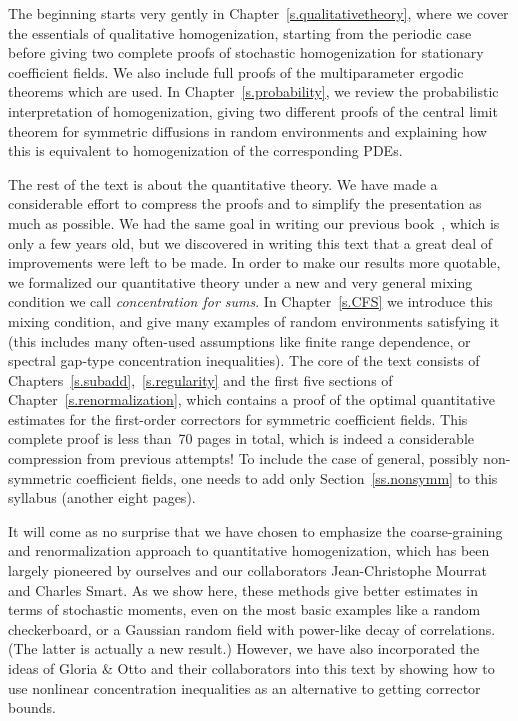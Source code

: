 \documentclass[11pt]{article} %
\numberwithin{equation}{section}
\theoremstyle{definition}
\begin{document}
 \smallskip
 
The beginning starts very gently in Chapter~\ref{s.qualitativetheory}, where we cover the essentials of qualitative homogenization, starting from the periodic case before giving two complete proofs of stochastic homogenization for stationary coefficient fields. We also include full proofs of the multiparameter ergodic theorems which are used. 
In Chapter~\ref{s.probability}, we review the probabilistic interpretation of homogenization, giving two different proofs of the central limit theorem for symmetric diffusions in random environments and explaining how this is equivalent to homogenization of the corresponding PDEs. 

\smallskip

The rest of the text is about the quantitative theory. We have made a considerable effort to compress the proofs and to simplify the presentation as much as possible. We had the same goal in writing our previous book~\cite{AKMBook}, which is only a few years old, but we discovered in writing this text that a great deal of improvements were left to be made. 
In order to make our results more quotable, we formalized our quantitative theory under a new and very general mixing condition we call \emph{concentration for sums}. In Chapter~\ref{s.CFS} we introduce this mixing condition, and give many examples of random environments satisfying it (this includes many often-used assumptions like finite range dependence, or spectral gap-type concentration inequalities). 
The core of the text consists of Chapters~\ref{s.subadd},~\ref{s.regularity} and the first five sections of Chapter~\ref{s.renormalization}, which contains a proof of the optimal quantitative estimates for the first-order correctors for symmetric coefficient fields. This complete proof is less than~70 pages in total, which is indeed a considerable compression from previous attempts! 
To include the case of general, possibly non-symmetric coefficient fields, one needs to add only Section~\ref{ss.nonsymm} to this syllabus (another eight pages). 

\smallskip

It will come as no surprise that we have chosen to emphasize the coarse-graining and renormalization approach to quantitative homogenization, which has been largely pioneered by ourselves and our collaborators Jean-Christophe Mourrat and Charles Smart. As we show here, these methods give better estimates in terms of stochastic moments, even on the most basic examples like a random checkerboard, or a Gaussian random field with power-like decay of correlations. (The latter is actually a new result.) However, we have also incorporated the ideas of Gloria \& Otto and their collaborators into this text by showing how to use nonlinear concentration inequalities as an alternative to getting corrector bounds. 
\end{document}
